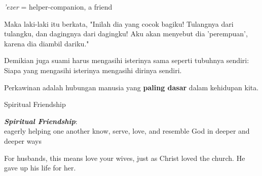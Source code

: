 \documentclass{beamer}
\begin{document}
\begin{frame}{}
	\LARGE
	\centering
	\textit{'ezer} = helper-companion, a friend
\end{frame}

\begin{frame}{}
	\Large
\begin{tcolorbox}[colback=green!5,colframe=green!40!black,title=Kejadian 2:23 (TSI)]
Maka laki-laki itu berkata, "Inilah dia yang cocok bagiku! Tulangnya dari tulangku, dan dagingnya dari dagingku! Aku akan menyebut dia 'perempuan', karena dia diambil dariku."
\end{tcolorbox}
\end{frame}

\begin{frame}{}
	\Large
	\begin{tcolorbox}[colback=green!5,colframe=green!40!black,title=Efesus 5:28 (TB)]
		Demikian juga suami harus mengasihi isterinya sama seperti tubuhnya sendiri: Siapa yang mengasihi isterinya mengasihi dirinya sendiri.
	\end{tcolorbox}
\end{frame}

\begin{frame}{}
	\LARGE
\centering
Perkawinan adalah hubungan manusia yang \textbf{paling dasar} dalam kehidupan kita.
\end{frame}



\begin{frame}{}
	\LARGE
	\centering
	Spiritual Friendship
\end{frame}

\begin{frame}{}
	\LARGE
	\centering
	\textit{\textbf{Spiritual Friendship}}:\\ 
	eagerly helping one another know, serve, love, and resemble God in deeper and deeper ways
\end{frame}

\begin{frame}{}
	\Large
	\begin{tcolorbox}[colback=green!5,colframe=green!40!black,title=Efesus 5:25 (NLT)]
		For husbands, this means love your wives, just as Christ loved the church. He gave up his life for her.
	\end{tcolorbox}
\end{frame}
\end{document}
